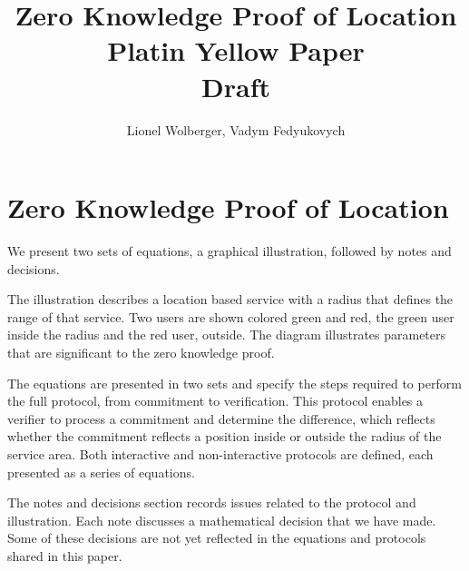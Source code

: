 \documentclass{article}
\begin{document}
\pagecolor{yellow}


\title{
	Zero Knowledge Proof of Location\\
	\small{
	Platin Yellow Paper\\
	Draft}
}
\author{Lionel Wolberger, Vadym Fedyukovych}
\maketitle

\section{Zero Knowledge Proof of Location}

We present two sets of equations, a graphical illustration, followed by notes and decisions. 

The illustration describes a location based service with a radius that defines the range of that service. Two users are shown colored green and red, the green user inside the radius and the red user, outside. The diagram illustrates parameters that are significant to the zero knowledge proof. 

The equations are presented in two sets and specify the steps required to perform the full protocol, from commitment to verification. This protocol enables a verifier to process a commitment and determine the difference, which reflects whether the commitment reflects a position inside or outside the radius of the service area. Both interactive  and non-interactive protocols are defined, each presented as a series of equations. 

The notes and decisions section records issues related to the protocol and illustration. Each note discusses a mathematical decision that we have made. Some of these decisions are not yet reflected in the equations and protocols shared in this paper. 
\end{document}
